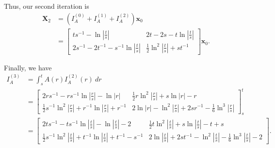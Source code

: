 \documentclass[12pt]{article}
\begin{document}
Thus, our second iteration is
\begin{align*}
    \mathbf{X}_2 & = (I_A^{(0)} + I_A^{(1)} + I_A^{(2)}) \mathbf{x}_0                                        \\
                 & = \begin{bmatrix}
                         ts^{-1} - \ln|\frac{t}{s}|                & 2t - 2s - t\ln|\frac{t}{s}|             \\
                         2s^{-1} -2t^{-1} - s^{-1}\ln|\frac{t}{s}| & \frac{1}{2}\ln^2|\frac{t}{s}| + st^{-1}
                     \end{bmatrix} \mathbf{x}_0.
\end{align*}

Finally, we have
\begin{align*}
    I_A^{(3)} & = \int_s^t A(r) I_A^{(2)}(r) ~ dr                                                                                                                                            \\
              & = \begin{bmatrix}
                      2rs^{-1} - rs^{-1} \ln|\frac{r}{s}| - \ln|r|                           & \frac{1}{2}r \ln^2|\frac{r}{s}| + s \ln|r| - r                           \\
                      \frac{1}{2}s^{-1}\ln^2|\frac{r}{s}| + r^{-1} \ln|\frac{r}{s}| + r^{-1} & 2\ln|r| - \ln^2|\frac{r}{s}| + 2sr^{-1} - \frac{1}{6} \ln^3|\frac{r}{s}|
                  \end{bmatrix}^t_s                      \\
              & = \begin{bmatrix}
                      2ts^{-1} - ts^{-1} \ln|\frac{t}{s}| - \ln|\frac{t}{s}| - 2                     & \frac{1}{2}t \ln^2|\frac{t}{s}| + s\ln|\frac{t}{s}| - t + s                           \\
                      \frac{1}{2}s^{-1}\ln^2|\frac{t}{s}| + t^{-1}\ln|\frac{t}{s}| + t^{-1} - s^{-1} & 2\ln|\frac{t}{s}| + 2st^{-1} - \ln^2|\frac{t}{s}| - \frac{1}{6}\ln^3|\frac{t}{s}| - 2
                  \end{bmatrix}.
\end{align*}
\end{document}
